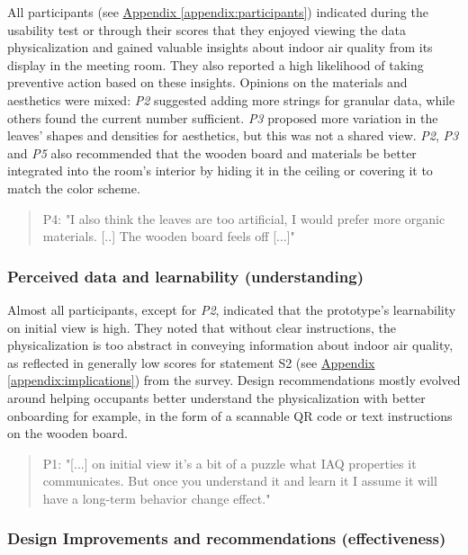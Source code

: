 All participants (see \hyperref[appendix:participants]{Appendix \ref*{appendix:participants}}) indicated during the usability test or through their scores that they enjoyed viewing the data physicalization and gained valuable insights about indoor air quality from its display in the meeting room. They also reported a high likelihood of taking preventive action based on these insights. Opinions on the materials and aesthetics were mixed: \textit{P2} suggested adding more strings for granular data, while others found the current number sufficient. \textit{P3} proposed more variation in the leaves' shapes and densities for aesthetics, but this was not a shared view. \textit{P2}, \textit{P3} and \textit{P5} also recommended that the wooden board and materials be better integrated into the room’s interior by hiding it in the ceiling or covering it to match the color scheme.

\begin{quote}
P4: "I also think the leaves are too artificial, I would prefer more organic materials. [..] The wooden board feels off [...]"
\end{quote}

\subsubsection{Perceived data and learnability (understanding)}
Almost all participants, except for \textit{P2}, indicated that the prototype's learnability on initial view is high. They noted that without clear instructions, the physicalization is too abstract in conveying information about indoor air quality, as reflected in generally low scores for statement S2 (see \hyperref[appendix:implications]{Appendix \ref*{appendix:implications}}) from the survey. Design recommendations mostly evolved around helping occupants better understand the physicalization with better onboarding for example, in the form of a scannable QR code or text instructions on the wooden board.

\begin{quote}
P1: "[...] on initial view it's a bit of a puzzle what IAQ properties it communicates. But once you understand it and learn it I assume it will have a long-term behavior change effect."
\end{quote}


\subsubsection{Design Improvements and recommendations (effectiveness)}

